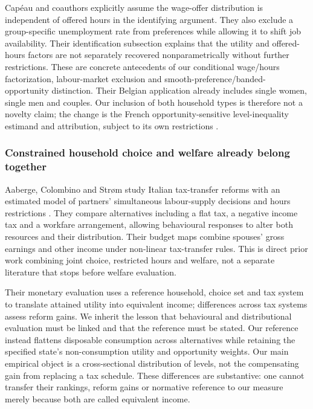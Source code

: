 \documentclass[11pt,a4paper]{article}
\begin{document}
Capéau and coauthors explicitly assume the wage-offer distribution is independent of offered hours in the identifying argument. They also exclude a group-specific unemployment rate from preferences while allowing it to shift job availability. Their identification subsection explains that the utility and offered-hours factors are not separately recovered nonparametrically without further restrictions. These are concrete antecedents of our conditional wage/hours factorization, labour-market exclusion and smooth-preference/banded-opportunity distinction. Their Belgian application already includes single women, single men and couples. Our inclusion of both household types is therefore not a novelty claim; the change is the French opportunity-sensitive level-inequality estimand and attribution, subject to its own restrictions \citep[identification and empirical-application subsections]{capeau2016}.

\subsubsection{Constrained household choice and welfare already belong together}\label{constrained-household-choice-and-welfare-already-belong-together}

Aaberge, Colombino and Strøm study Italian tax-transfer reforms with an estimated model of partners' simultaneous labour-supply decisions and hours restrictions \citep[section 2 and Appendix A]{aaberge2004}. They compare alternatives including a flat tax, a negative income tax and a workfare arrangement, allowing behavioural responses to alter both resources and their distribution. Their budget maps combine spouses' gross earnings and other income under non-linear tax-transfer rules. This is direct prior work combining joint choice, restricted hours and welfare, not a separate literature that stops before welfare evaluation.

Their monetary evaluation uses a reference household, choice set and tax system to translate attained utility into equivalent income; differences across tax systems assess reform gains. We inherit the lesson that behavioural and distributional evaluation must be linked and that the reference must be stated. Our reference instead flattens disposable consumption across alternatives while retaining the specified state's non-consumption utility and opportunity weights. Our main empirical object is a cross-sectional distribution of levels, not the compensating gain from replacing a tax schedule. These differences are substantive: one cannot transfer their rankings, reform gains or normative reference to our measure merely because both are called equivalent income.
\end{document}
